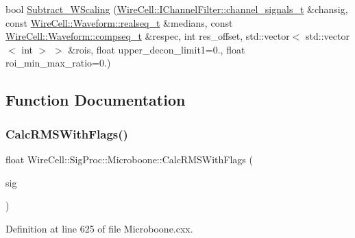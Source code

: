 \begin{DoxyCompactItemize}
\item 
bool \hyperlink{namespace_wire_cell_1_1_sig_proc_1_1_microboone_a06023d4f9428b8e2f9ce469d3bacb7b4}{Subtract\+\_\+\+W\+Scaling} (\hyperlink{class_wire_cell_1_1_i_channel_filter_a44de35ce47701d84cd45393c6bcd5e2f}{Wire\+Cell\+::\+I\+Channel\+Filter\+::channel\+\_\+signals\+\_\+t} \&chansig, const \hyperlink{namespace_wire_cell_1_1_waveform_a479175e541c8545e87cd8063b74b6956}{Wire\+Cell\+::\+Waveform\+::realseq\+\_\+t} \&medians, const \hyperlink{namespace_wire_cell_1_1_waveform_a7e4a8d371f774438bb360e7d1dcb583a}{Wire\+Cell\+::\+Waveform\+::compseq\+\_\+t} \&respec, int res\+\_\+offset, std\+::vector$<$ std\+::vector$<$ int $>$ $>$ \&rois, float upper\+\_\+decon\+\_\+limit1=0., float roi\+\_\+min\+\_\+max\+\_\+ratio=0.)
\end{DoxyCompactItemize}


\subsection{Function Documentation}
\mbox{\label{namespace_wire_cell_1_1_sig_proc_1_1_microboone_ae364f8dbc0dad92d515850a86baefb13}} 
\subsubsection{\texorpdfstring{Calc\+R\+M\+S\+With\+Flags()}{CalcRMSWithFlags()}}
{\footnotesize\ttfamily float Wire\+Cell\+::\+Sig\+Proc\+::\+Microboone\+::\+Calc\+R\+M\+S\+With\+Flags (\begin{DoxyParamCaption}\item[{const \hyperlink{namespace_wire_cell_1_1_waveform_a479175e541c8545e87cd8063b74b6956}{Wire\+Cell\+::\+Waveform\+::realseq\+\_\+t} \&}]{sig }\end{DoxyParamCaption})}



Definition at line 625 of file Microboone.\+cxx.

